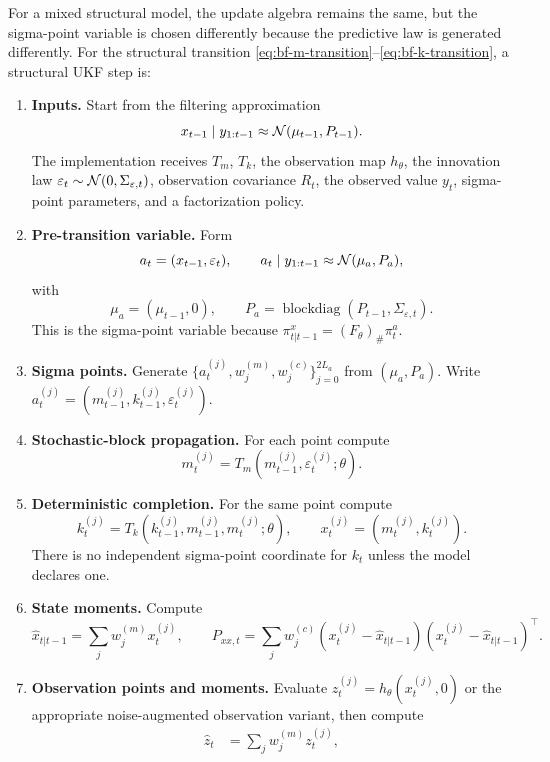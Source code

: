 For a mixed structural model, the update algebra remains the same, but the
sigma-point variable is chosen differently because the predictive law is
generated differently.  For the structural transition
\eqref{eq:bf-m-transition}--\eqref{eq:bf-k-transition}, a structural UKF step
is:
\begin{enumerate}[label=\textbf{S\arabic*.}]
  \item \textbf{Inputs.}  Start from the filtering approximation
    \[
      x_{t-1}\mid y_{1:t-1} \approx \mathcal{N}(\mu_{t-1},P_{t-1}).
    \]
    The implementation receives $T_m$, $T_k$, the observation map
    $h_\theta$, the innovation law
    $\varepsilon_t\sim\mathcal{N}(0,\Sigma_{\varepsilon,t})$, observation covariance
    $R_t$, the observed value $y_t$, sigma-point parameters, and a
    factorization policy.
  \item \textbf{Pre-transition variable.}  Form
    \[
      a_t = (x_{t-1},\varepsilon_t),
      \qquad
      a_t\mid y_{1:t-1}\approx\mathcal{N}(\mu_a,P_a),
    \]
    with
    \[
      \mu_a=(\mu_{t-1},0),\qquad
      P_a=\operatorname{blockdiag}(P_{t-1},\Sigma_{\varepsilon,t}).
    \]
    This is the sigma-point variable because
    $\pi_{t|t-1}^x=(F_\theta)_\#\pi_t^a$.
  \item \textbf{Sigma points.}  Generate
    $\{a_t^{(j)},w_j^{(m)},w_j^{(c)}\}_{j=0}^{2L_a}$ from
    $(\mu_a,P_a)$.  Write
    $a_t^{(j)}=(m_{t-1}^{(j)},k_{t-1}^{(j)},\varepsilon_t^{(j)})$.
  \item \textbf{Stochastic-block propagation.}  For each point compute
    \[
      m_t^{(j)}
      =
      T_m(m_{t-1}^{(j)},\varepsilon_t^{(j)};\theta).
    \]
  \item \textbf{Deterministic completion.}  For the same point compute
    \[
      k_t^{(j)}
      =
      T_k(k_{t-1}^{(j)},m_{t-1}^{(j)},m_t^{(j)};\theta),
      \qquad
      x_t^{(j)}=(m_t^{(j)},k_t^{(j)}).
    \]
    There is no independent sigma-point coordinate for $k_t$ unless the model
    declares one.
  \item \textbf{State moments.}  Compute
    \[
      \hat x_{t|t-1}=\sum_j w_j^{(m)}x_t^{(j)},\qquad
      P_{xx,t}=\sum_j w_j^{(c)}
      (x_t^{(j)}-\hat x_{t|t-1})(x_t^{(j)}-\hat x_{t|t-1})^\top .
    \]
  \item \textbf{Observation points and moments.}  Evaluate
    $z_t^{(j)}=h_\theta(x_t^{(j)},0)$ or the appropriate noise-augmented
    observation variant, then compute
    \begin{align}
      \hat z_t &= \sum_j w_j^{(m)}z_t^{(j)},\\

\end{align}
\end{enumerate}
